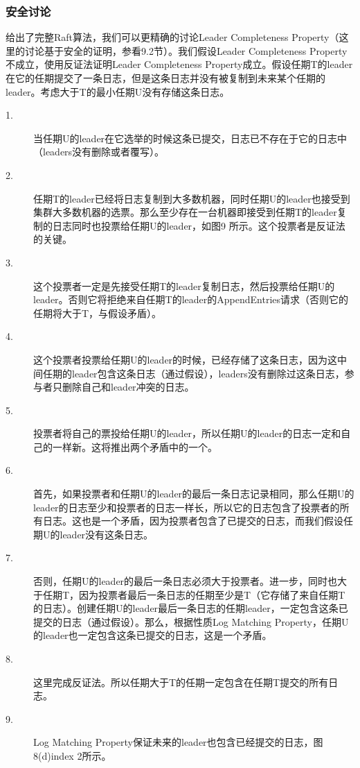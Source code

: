 \documentclass[journal]{IEEEtran}
\begin{document}
\subsubsection{安全讨论}

给出了完整Raft算法，我们可以更精确的讨论Leader Completeness Property（这里的讨论基于安全的证明，参看9.2节）。我们假设Leader Completeness Property不成立，使用反证法证明Leader Completeness Property成立。假设任期T的leader在它的任期提交了一条日志，但是这条日志并没有被复制到未来某个任期的leader。考虑大于T的最小任期U没有存储这条日志。

\begin{description}
\item[1.]当任期U的leader在它选举的时候这条已提交，日志已不存在于它的日志中（leaders没有删除或者覆写）。
\item[2.]任期T的leader已经将日志复制到大多数机器，同时任期U的leader也接受到集群大多数机器的选票。那么至少存在一台机器即接受到任期T的leader复制的日志同时也投票给任期U的leader，如图9
所示。这个投票者是反证法的关键。
\item[3.]这个投票者一定是先接受任期T的leader复制日志，然后投票给任期U的leader。否则它将拒绝来自任期T的leader的AppendEntries请求（否则它的任期将大于T，与假设矛盾）。
\item[4.]这个投票者投票给任期U的leader的时候，已经存储了这条日志，因为这中间任期的leader包含这条日志（通过假设），leaders没有删除过这条日志，参与者只删除自己和leader冲突的日志。
\item[5.]投票者将自己的票投给任期U的leader，所以任期U的leader的日志一定和自己的一样新。这将推出两个矛盾中的一个。
\item[6.]首先，如果投票者和任期U的leader的最后一条日志记录相同，那么任期U的leader的日志至少和投票者的日志一样长，所以它的日志包含了投票者的所有日志。这也是一个矛盾，因为投票者包含了已提交的日志，而我们假设任期U的leader没有这条日志。
\item[7.]否则，任期U的leader的最后一条日志必须大于投票者。进一步，同时也大于任期T，因为投票者最后一条日志的任期至少是T（它存储了来自任期T的日志）。创建任期U的leader最后一条日志的任期leader，一定包含这条已提交的日志（通过假设）。那么，根据性质Log Matching Property，任期U的leader也一定包含这条已提交的日志，这是一个矛盾。
\item[8.]这里完成反证法。所以任期大于T的任期一定包含在任期T提交的所有日志。
\item[9.]Log Matching Property保证未来的leader也包含已经提交的日志，图8(d)index 2所示。
\end{description}
\end{document}
